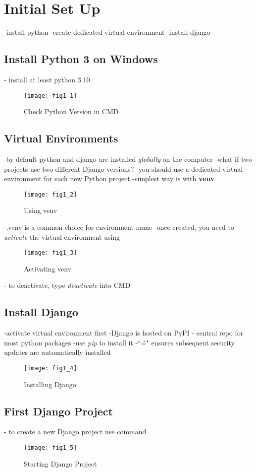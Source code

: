 \documentclass{article}
\begin{document}
\iffalse

\section{Initial Set Up}
-install python
-create dedicated virtual environment
-install django

\subsection{Install Python 3 on Windows}
- install at least python 3.10
\begin{figure}[H]
	\centering
	\texttt{[image: fig1\_1]}
	\caption {Check Python Version in CMD}
\end{figure}


\subsection{Virtual Environments}
-by default python and django are installed \textit{globally} on the computer
-what if two projects use two different Django versions?
-you should use a dedicated virtual environment for each new Python project
-simplest way is with \textbf{venv}
\begin{figure}[H]
	\centering
	\texttt{[image: fig1\_2]}
	\caption {Using venv}
\end{figure}
-.venv is a common choice for environment name
-once created, you need to \textit{activate} the virtual environment using
\begin{figure}[H]
	\centering
	\texttt{[image: fig1\_3]}
	\caption {Activating venv}
\end{figure}
- to deactivate, type \textit{deactivate} into CMD


\subsection{Install Django}

-activate virtual environment first
-Django is hosted on PyPI - central repo for most python packages
-use \textit{pip} to install it 
-``\~=" ensures subsequent security updates are automatically installed
\begin{figure}[H]
	\centering
	\texttt{[image: fig1\_4]}
	\caption {Installing Django}
\end{figure}



\subsection{First Django Project}
- to create a new Django project use command
\begin{figure}[H]
	\centering
	\texttt{[image: fig1\_5]}
	\caption {Starting Django Project}
\end{figure}
\end{document}
